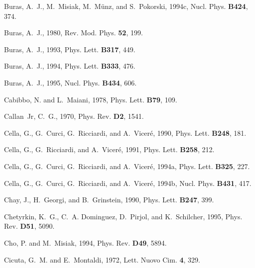 \begin{thebibliography}{\protect{}1991}
Buras, A.~J., M.~Misiak, M.~M{\"u}nz, and S.~Pokorski, 1994c,
\newblock Nucl. Phys. {\bf B424}, 374.

Buras, A.~J., 1980,
\newblock Rev. Mod. Phys. {\bf 52}, 199.

Buras, A.~J., 1993,
\newblock Phys. Lett. {\bf B317}, 449.

Buras, A.~J., 1994,
\newblock Phys. Lett. {\bf B333}, 476.

Buras, A.~J., 1995,
\newblock Nucl. Phys. {\bf B434}, 606.

Cabibbo, N. and L.~Maiani, 1978,
\newblock Phys. Lett. {\bf B79}, 109.

{Callan~Jr}, C.~G., 1970,
\newblock Phys. Rev. {\bf D2}, 1541.

Cella, G., G.~Curci, G.~Ricciardi, and A.~Vicer\'{e}, 1990,
\newblock Phys. Lett. {\bf B248}, 181.

Cella, G., G.~Ricciardi, and A.~Vicer\'{e}, 1991,
\newblock Phys. Lett. {\bf B258}, 212.

Cella, G., G.~Curci, G.~Ricciardi, and A.~Vicer{\'e}, 1994a,
\newblock Phys. Lett. {\bf B325}, 227.

Cella, G., G.~Curci, G.~Ricciardi, and A.~Vicer{\'e}, 1994b,
\newblock Nucl. Phys. {\bf B431}, 417.

Chay, J., H.~Georgi, and B.~Grinstein, 1990,
\newblock Phys. Lett. {\bf B247}, 399.

Chetyrkin, K.~G., C.~A. Dominguez, D.~Pirjol, and K.~Schilcher, 1995,
\newblock Phys. Rev. {\bf D51}, 5090.

Cho, P. and M.~Misiak, 1994,
\newblock Phys. Rev. {\bf D49}, 5894.

Cicuta, G.~M. and E.~Montaldi, 1972,
\newblock Lett. Nuovo Cim. {\bf 4}, 329.


\end{thebibliography}
